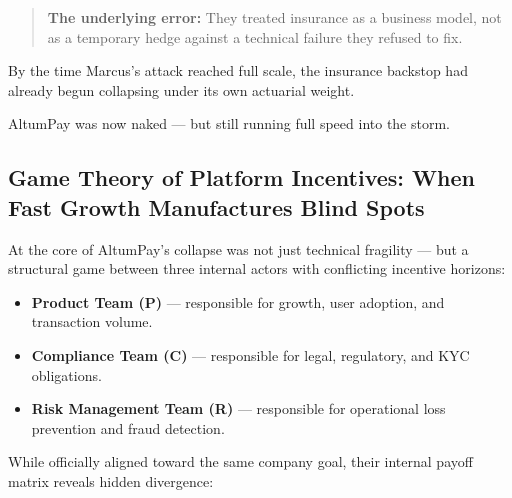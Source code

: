\bigskip

\begin{quote}
\textbf{The underlying error:}  
They treated insurance as a business model, not as a temporary hedge against a technical failure they refused to fix.
\end{quote}

\bigskip

By the time Marcus’s attack reached full scale, the insurance backstop had already begun collapsing under its own actuarial weight.

AltumPay was now naked — but still running full speed into the storm.


\subsection{Game Theory of Platform Incentives: When Fast Growth Manufactures Blind Spots}

At the core of AltumPay’s collapse was not just technical fragility — but a structural game between three internal actors with conflicting incentive horizons:

\begin{itemize}
  \item \textbf{Product Team (P)} --- responsible for growth, user adoption, and transaction volume.
  \item \textbf{Compliance Team (C)} --- responsible for legal, regulatory, and KYC obligations.
  \item \textbf{Risk Management Team (R)} --- responsible for operational loss prevention and fraud detection.
\end{itemize}

While officially aligned toward the same company goal, their internal payoff matrix reveals hidden divergence:

